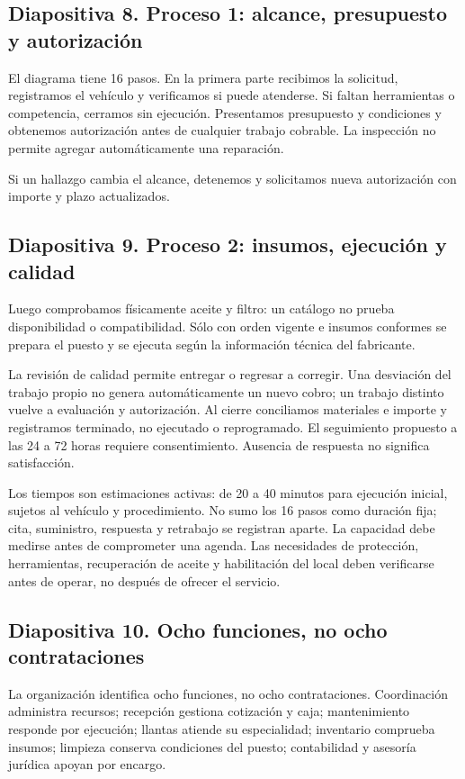 {\subsection{Diapositiva 8. Proceso 1: alcance, presupuesto y autorización}
El diagrama tiene 16 pasos. En la primera parte recibimos la solicitud, registramos el vehículo y verificamos si puede atenderse. Si faltan herramientas o competencia, cerramos sin ejecución. Presentamos presupuesto y condiciones y obtenemos autorización antes de cualquier trabajo cobrable. La inspección no permite agregar automáticamente una reparación.

Si un hallazgo cambia el alcance, detenemos y solicitamos nueva autorización con importe y plazo actualizados.

\subsection{Diapositiva 9. Proceso 2: insumos, ejecución y calidad}
Luego comprobamos físicamente aceite y filtro: un catálogo no prueba disponibilidad o compatibilidad. Sólo con orden vigente e insumos conformes se prepara el puesto y se ejecuta según la información técnica del fabricante.

La revisión de calidad permite entregar o regresar a corregir. Una desviación del trabajo propio no genera automáticamente un nuevo cobro; un trabajo distinto vuelve a evaluación y autorización. Al cierre conciliamos materiales e importe y registramos terminado, no ejecutado o reprogramado. El seguimiento propuesto a las 24 a 72 horas requiere consentimiento. Ausencia de respuesta no significa satisfacción.

Los tiempos son estimaciones activas: de 20 a 40 minutos para ejecución inicial, sujetos al vehículo y procedimiento. No sumo los 16 pasos como duración fija; cita, suministro, respuesta y retrabajo se registran aparte. La capacidad debe medirse antes de comprometer una agenda. Las necesidades de protección, herramientas, recuperación de aceite y habilitación del local deben verificarse antes de operar, no después de ofrecer el servicio.

\subsection{Diapositiva 10. Ocho funciones, no ocho contrataciones}
La organización identifica ocho funciones, no ocho contrataciones. Coordinación administra recursos; recepción gestiona cotización y caja; mantenimiento responde por ejecución; llantas atiende su especialidad; inventario comprueba insumos; limpieza conserva condiciones del puesto; contabilidad y asesoría jurídica apoyan por encargo.

}
